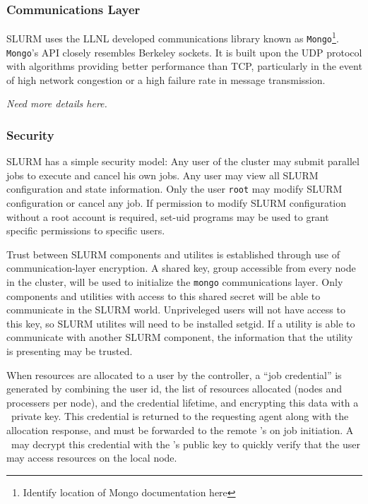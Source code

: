 \subsubsection{Communications Layer}

SLURM uses the LLNL developed communications library known as 
{\tt Mongo}\footnote{Identify location of Mongo documentation here}. 
{\tt Mongo}'s API closely resembles Berkeley sockets. It is built upon the UDP 
protocol with algorithms providing better performance than TCP, particularly 
in the event of high network congestion or a high failure rate in message 
transmission.

{\em Need more details here.}

\subsubsection{Security}

SLURM has a simple security model: 
Any user of the cluster may submit parallel jobs to execute and cancel
his own jobs.  Any user may view all SLURM configuration and state
information.  Only the user {\tt root} may modify SLURM configuration or
cancel any job.  If permission to modify SLURM configuration without a
root account is required, set-uid programs may be used to grant specific
permissions to specific users.

Trust between SLURM components and utilites is established through use
of communication-layer encryption. A shared key, group accessible from
every node in the cluster, will be used to initialize the {\tt mongo}
communications layer. Only components and utilities with access to this
shared secret will be able to communicate in the SLURM world. Unpriveleged
users will not have access to this key, so SLURM utilites will need to be
installed setgid. If a utility is able to communicate with another SLURM
component, the information that the utility is presenting may be trusted.

When resources are allocated to a user by the controller, a ``job 
credential'' is generated by combining the user id, the list of
resources allocated (nodes and processers per node), and the credential
lifetime, and encrypting this data with a \slurmctld\ private key. This
credential is returned to the requesting agent along with the
allocation response, and must be forwarded to the remote \slurmd 's 
on job initiation. A \slurmd\ may decrypt this credential with the
\slurmctld 's public key to quickly verify that the user may access
resources on the local node. 

